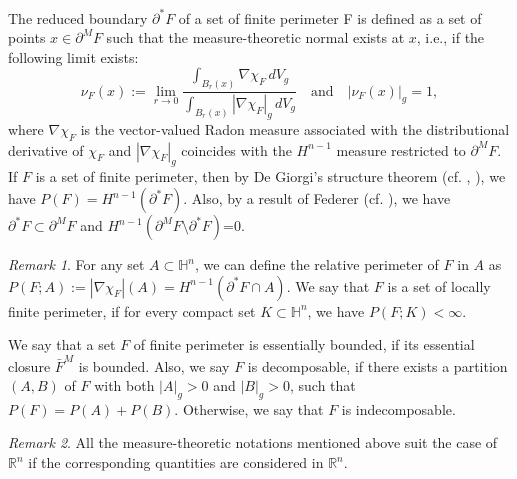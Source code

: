 \documentclass[11pt,reqno]{amsart}
\theoremstyle{definition}
\theoremstyle{remark}
\newtheorem{rem}{Remark}
\numberwithin{equation}{section}
\renewcommand{\(}{\left(}
\renewcommand{\)}{\right)}
\renewcommand{\-}{\overline}
\begin{document}
The reduced boundary $\partial^{*}F$ of a set of finite perimeter F is defined as a set of points $x\in\partial^M F$ such that the measure-theoretic normal exists at $x$, i.e., if the following limit exists:
\begin{equation*}
	\nu_F(x):=\lim_{r\to 0}\frac{\int_{B_r(x)}{\nabla{\chi_{F}}\,dV_g}}{\int_{B_r(x)}{|\nabla{\chi_{F}}|_g\,dV_g}}\quad \text{and}\quad |\nu_F(x)|_g=1,
\end{equation*}
where $\nabla\chi_F$ is the vector-valued Radon measure associated with the distributional derivative of $\chi_F$ and $|\nabla{\chi_{F}}|_g$ coincides with the $H^{n-1}$ measure restricted to $\partial^M F$. If $F$ is a set of finite perimeter, then by De Giorgi’s structure theorem (cf. \cite[Theorem 3.59]{Ambrosio-Fusco-Pallara00}, \cite[Theorem 15.9]{Maggi-12}), we have $P(F)=H^{n-1}(\partial^{*}F)$. Also, by a result of Federer (cf. \cite[Theorem 3.61]{Ambrosio-Fusco-Pallara00}), we have $\partial^{*} F\subset\partial^M F$ and $H^{n-1}(\partial^M F\setminus\partial^{*} F)$=0. 
\begin{rem}
	For any set $A\subset\mathbb{H}^n$, we can define the relative perimeter of $F$ in $A$ as $P(F;A):=|\nabla{\chi_{F}}|(A)=H^{n-1}(\partial^{*}F\cap A)$. We say that $F$ is a set of locally finite perimeter, if for every compact set $K\subset\mathbb{H}^n$, we have $P(F;K)<\infty$.
\end{rem}

We say that a set $F$ of finite perimeter is essentially bounded, if its essential closure $\bar{F}^{M}$ is bounded. Also, we say $F$ is decomposable, if there exists a partition $(A,B)$ of $F$ with both $|A|_g>0$ and $|B|_g>0$, such that $P(F)=P(A)+P(B)$. Otherwise, we say that $F$ is indecomposable.
\begin{rem}
	All the measure-theoretic notations mentioned above suit the case of $\mathbb{R}^n$ if the corresponding quantities are considered in $\mathbb{R}^n$.
\end{rem}
\end{document}
